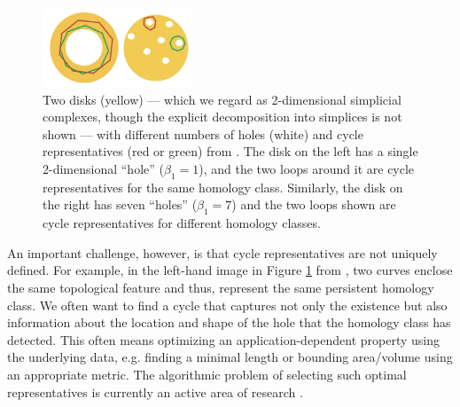 \documentclass[11pt,onecolumn]{article}
\newcommand{\fig}{Figure }
\theoremstyle{plain}
\theoremstyle{definition}
\begin{document}
\begin{figure}[!h]
    \centering
    \includegraphics[width=0.4\textwidth]{figures/generatorExample.jpg}
    \caption{Two disks (yellow) --- which we regard as 2-dimensional simplicial complexes, though the explicit decomposition into simplices is not shown --- with different numbers of holes (white) and cycle representatives (red or green) from \cite{Carlsson2009TopologyAD}. The disk on the left has a single 2-dimensional  ``hole'' ($\beta_1 = 1$), and the two loops around it are cycle representatives for the same homology class. Similarly, the disk on the right has seven ``holes'' ($\beta_1 = 7$) and the two loops shown are cycle representatives for different homology classes.
    }
    \label{fig:generatorExamples}
\end{figure}

An important challenge, however, is that cycle representatives are not uniquely defined. For example, in the left-hand image in \fig \ref{fig:generatorExamples} from \cite{Carlsson2009TopologyAD}, two curves enclose the same topological feature and thus, represent the same persistent homology class. We often want to find a cycle that captures not only the existence but also information about the location and shape of the hole that the homology class has detected. This often means optimizing an application-dependent property using the underlying data, e.g. finding a minimal length or bounding area/volume using an appropriate metric. The algorithmic problem of selecting such optimal representatives is currently an active area of research \cite{dey2011optimal,dey2018,Obayashi2018,wu,chen2010measuring}. 
\end{document}
